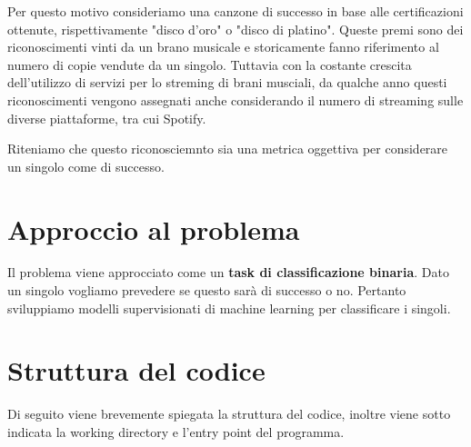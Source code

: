 Per questo motivo consideriamo una canzone di successo in base alle certificazioni ottenute, rispettivamente "disco d'oro" o "disco di platino". Queste premi sono dei riconoscimenti vinti da un brano musicale e storicamente fanno riferimento al numero di copie vendute da un singolo. Tuttavia con la costante crescita dell'utilizzo di servizi per lo streming di brani musciali, da qualche anno questi riconoscimenti vengono assegnati anche considerando il numero di streaming sulle diverse piattaforme, tra cui Spotify.

Riteniamo che questo riconosciemnto sia una metrica oggettiva per considerare un singolo come di successo.

\section{Approccio al problema}
Il problema viene approcciato come un \textbf{task di classificazione binaria}. Dato un singolo vogliamo prevedere se questo sarà di successo o no. Pertanto sviluppiamo modelli supervisionati di machine learning per classificare i singoli.


\section{Struttura del codice}
Di seguito viene brevemente spiegata la struttura del codice, inoltre viene sotto indicata la working directory e l'entry point del programma.


